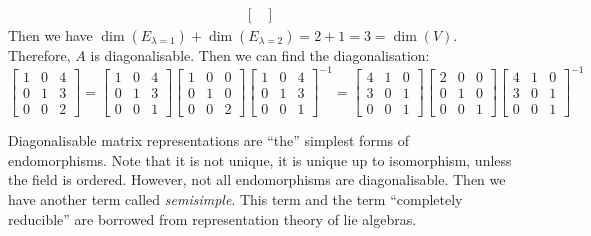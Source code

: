 \begin{example}
\begin{align*}
\begin{bmatrix}
                                                                            \end{bmatrix}
  \end{align*}
  Then we have $\dim(E_{\lambda = 1}) + \dim(E_{\lambda = 2}) = 2 + 1 = 3 = \dim(V)$. Therefore, $A$ is diagonalisable. Then we can find the diagonalisation:
  \[
    \begin{bmatrix}
      1 & 0 & 4 \\
      0 & 1 & 3 \\
      0 & 0 & 2
    \end{bmatrix} = \begin{bmatrix}
      1 & 0 & 4 \\
      0 & 1 & 3 \\
      0 & 0 & 1
    \end{bmatrix} \begin{bmatrix}
      1 & 0 & 0 \\
      0 & 1 & 0 \\
      0 & 0 & 2
    \end{bmatrix} \begin{bmatrix}
      1 & 0 & 4 \\
      0 & 1 & 3 \\
      0 & 0 & 1
    \end{bmatrix}^{-1} = \begin{bmatrix}
      4 & 1 & 0 \\
      3 & 0 & 1 \\
      0 & 0 & 1
    \end{bmatrix} \begin{bmatrix}
      2 & 0 & 0 \\
      0 & 1 & 0 \\
      0 & 0 & 1
    \end{bmatrix} \begin{bmatrix}
      4 & 1 & 0 \\
      3 & 0 & 1 \\
      0 & 0 & 1
    \end{bmatrix}^{-1}
  \]
\end{example}

Diagonalisable matrix representations are ``the'' simplest forms of endomorphisms. Note that it is not unique, it is unique up to isomorphism, unless the field is ordered. However, not all endomorphisms are diagonalisable. Then we have another term called \emph{semisimple}. This term and the term ``completely reducible'' are borrowed from representation theory of lie algebras.

